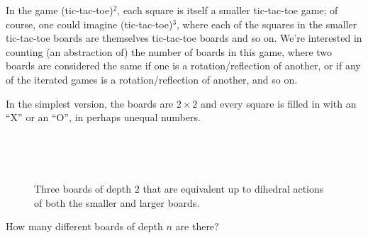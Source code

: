 \documentclass{article}
\begin{document}
In the game (tic-tac-toe)$^2$, each square is itself a smaller tic-tac-toe game;
of course, one could imagine (tic-tac-toe)$^3$, where each of the squares in
the smaller tic-tac-toe boards are themselves tic-tac-toe boards and so on.
We're interested in counting (an abstraction of) the number of boards in this game,
where two boards are considered the same if one is a rotation/reflection of
another, or if any of the iterated games is a rotation/reflection of another,
and so on.

In the simplest version, the boards are $2 \times 2$ and every square is
filled in with an ``X'' or an ``O'', in perhaps unequal numbers.

\begin{figure}[ht!]
  \centering
  ~
  ~
  \caption{
    Three boards of depth $2$ that are equivalent up to dihedral
    actions of both the smaller and larger boards.
  }
\end{figure}

\begin{question}
  How many different boards of depth $n$ are there?
\end{question}
\end{document}
